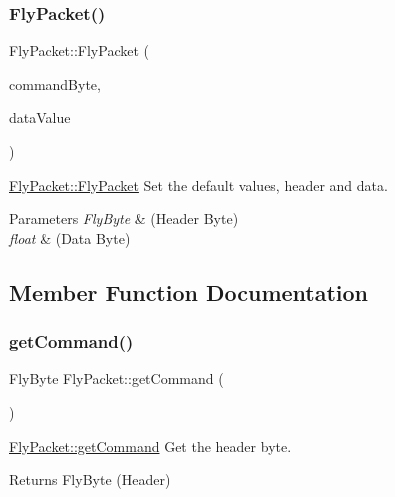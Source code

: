 \subsubsection{\texorpdfstring{Fly\+Packet()}{FlyPacket()}\hspace{0.1cm}{\footnotesize\ttfamily [2/2]}}
{\footnotesize\ttfamily Fly\+Packet\+::\+Fly\+Packet (\begin{DoxyParamCaption}\item[{Fly\+Byte}]{command\+Byte,  }\item[{float}]{data\+Value }\end{DoxyParamCaption})}



\hyperlink{class_fly_packet_aca19954f7e01d839b5759245a9950d57}{Fly\+Packet\+::\+Fly\+Packet} Set the default values, header and data. 


\begin{DoxyParams}{Parameters}
{\em Fly\+Byte} & (Header Byte) \\
\hline
{\em float} & (Data Byte) \\
\hline
\end{DoxyParams}


\subsection{Member Function Documentation}
\hypertarget{class_fly_packet_af0989edccb2cff9652f5a3c38fd210a2}{}\label{class_fly_packet_af0989edccb2cff9652f5a3c38fd210a2} 
\subsubsection{\texorpdfstring{get\+Command()}{getCommand()}}
{\footnotesize\ttfamily Fly\+Byte Fly\+Packet\+::get\+Command (\begin{DoxyParamCaption}{ }\end{DoxyParamCaption})}



\hyperlink{class_fly_packet_af0989edccb2cff9652f5a3c38fd210a2}{Fly\+Packet\+::get\+Command} Get the header byte. 

\begin{DoxyReturn}{Returns}
Fly\+Byte (Header) 
\end{DoxyReturn}
\hypertarget{class_fly_packet_a8987702368547e049b1f7ab8e979ce91}{}\label{class_fly_packet_a8987702368547e049b1f7ab8e979ce91} 
